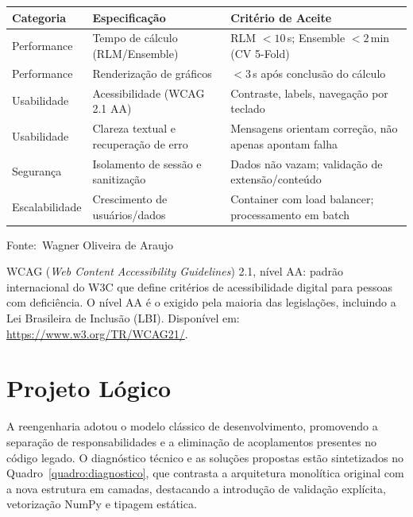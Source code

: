 \documentclass[12pt,a4paper]{article}
\newcommand{\oautor}{Wagner Oliveira de Araujo}
\begin{document}
\begin{quadro}[ht]
\centering
\small
\caption{Especificação de requisitos não funcionais}
\label{quadro:nao-funcionais}
\begin{threeparttable}
\begin{tabularx}{\textwidth}{|l|X|X|} \hline
\textbf{Categoria} & \textbf{Especificação} & \textbf{Critério de Aceite} \\ \hline
Performance & Tempo de cálculo (RLM/Ensemble) & RLM $< 10\,$s; Ensemble $< 2\,$min (CV 5-Fold) \\ \hline
Performance & Renderização de gráficos & $< 3\,$s após conclusão do cálculo \\ \hline
Usabilidade & Acessibilidade (WCAG 2.1 AA)\tnote{a} & Contraste, labels, navegação por teclado \\ \hline
Usabilidade & Clareza textual e recuperação de erro & Mensagens orientam correção, não apenas apontam falha \\ \hline
Segurança & Isolamento de sessão e sanitização & Dados não vazam; validação de extensão/conteúdo \\ \hline
Escalabilidade & Crescimento de usuários/dados & Container com load balancer; processamento em batch \\ \hline
\end{tabularx}
\begin{tablenotes}[flushleft]
\footnotesize
\item Fonte:~\oautor
\item[\textit{a}] WCAG (\textit{Web Content Accessibility Guidelines}) 2.1, nível AA: padrão internacional do W3C que define critérios de acessibilidade digital para pessoas com deficiência. O nível AA é o exigido pela maioria das legislações, incluindo a Lei Brasileira de Inclusão (LBI). Disponível em: \url{https://www.w3.org/TR/WCAG21/}.
\end{tablenotes}
\end{threeparttable}
\end{quadro}

\newpage
\section{Projeto Lógico}

A reengenharia adotou o modelo clássico de desenvolvimento, promovendo a separação de responsabilidades e a eliminação de acoplamentos presentes no código legado. O diagnóstico técnico e as soluções propostas estão sintetizados no Quadro~\ref{quadro:diagnostico}, que contrasta a arquitetura monolítica original com a nova estrutura em camadas, destacando a introdução de validação explícita, vetorização NumPy e tipagem estática.
\end{document}
